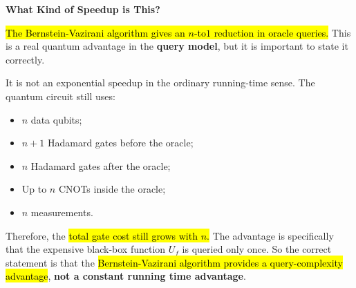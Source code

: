 \highspace
\begin{flushleft}
    \textcolor{Green3}{ \textbf{What Kind of Speedup is This?}}
\end{flushleft}
\hl{The Bernstein-Vazirani algorithm gives an $n$-to$1$ reduction in oracle queries.} This is a real quantum advantage in the \textbf{query model}, but it is important to state it correctly.

\highspace
It is not an exponential speedup in the ordinary running-time sense. The quantum circuit still uses:
\begin{itemize}
    \item $n$ data qubits;
    \item $n+1$ Hadamard gates before the oracle;
    \item $n$ Hadamard gates after the oracle;
    \item Up to $n$ CNOTs inside the oracle;
    \item $n$ measurements.
\end{itemize}
Therefore, the \hl{total gate cost still grows with $n$.} The advantage is specifically that the expensive black-box function $U_f$ is queried only once. So the correct statement is that the \hl{Bernstein-Vazirani algorithm provides a query-complexity advantage}, \textbf{not a constant running time advantage}.

